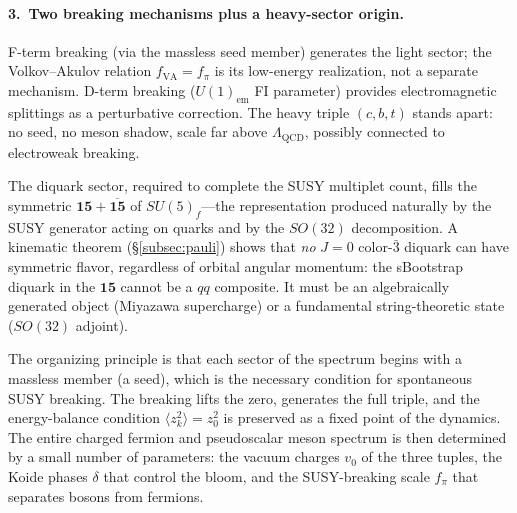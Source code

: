 \documentclass[12pt,a4paper]{article}
\begin{document}
\paragraph{3.\ Two breaking mechanisms plus a heavy-sector origin.}
F-term breaking (via the massless seed member) generates the light 
sector; the Volkov--Akulov relation $f_{\text{VA}} = f_\pi$ is its 
low-energy realization, not a separate mechanism. D-term breaking 
($U(1)_{\text{em}}$ FI parameter) provides electromagnetic 
splittings as a perturbative correction. The heavy triple 
$(c,b,t)$ stands apart: no seed, no meson shadow, scale far above 
$\Lambda_{\text{QCD}}$, possibly connected to electroweak breaking.

The diquark sector, required to complete the SUSY multiplet count, 
fills the symmetric $\mathbf{15} + \overline{\mathbf{15}}$ of 
$SU(5)_f$---the representation produced naturally by the SUSY 
generator acting on quarks and by the $SO(32)$ decomposition. A 
kinematic theorem (\S\ref{subsec:pauli}) shows that \emph{no} 
$J=0$ color-$\bar{3}$ diquark can have symmetric flavor, regardless 
of orbital angular momentum: the sBootstrap diquark in the 
$\mathbf{15}$ cannot be a $qq$ composite. It must be an 
algebraically generated object (Miyazawa supercharge) or a 
fundamental string-theoretic state ($SO(32)$ adjoint).

The organizing principle is that each sector of the spectrum begins 
with a massless member (a seed), which is the necessary condition 
for spontaneous SUSY breaking. The breaking lifts the zero, 
generates the full triple, and the energy-balance condition 
$\langle z_k^2\rangle = z_0^2$ is preserved as a fixed point 
of the dynamics. The entire charged fermion and pseudoscalar meson 
spectrum is then determined by a small number of parameters: the 
vacuum charges $v_0$ of the three tuples, the Koide phases 
$\delta$ that control the bloom, and the SUSY-breaking scale 
$f_\pi$ that separates bosons from fermions.
\end{document}
